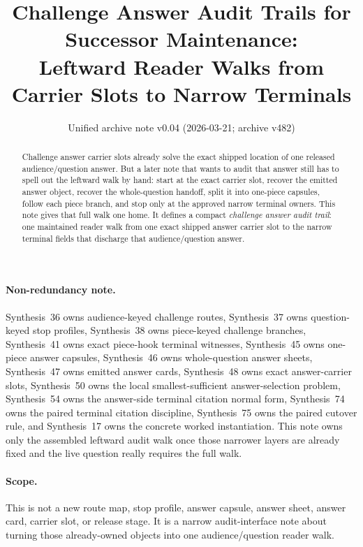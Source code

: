 \documentclass[11pt]{article}
\title{Challenge Answer Audit Trails for Successor Maintenance:\\[0.5ex]
\large Leftward Reader Walks from Carrier Slots to Narrow Terminals}
\author{}
\date{Unified archive note v0.04 (2026-03-21; archive v482)}
\begin{document}
\maketitle

\begin{abstract}
Challenge answer carrier slots already solve the exact shipped location of one released audience/question answer.
But a later note that wants to audit that answer still has to spell out the leftward walk by hand: start at the exact carrier slot, recover the emitted answer object, recover the whole-question handoff, split it into one-piece capsules, follow each piece branch, and stop only at the approved narrow terminal owners.
This note gives that full walk one home.
It defines a compact \emph{challenge answer audit trail}: one maintained reader walk from one exact shipped answer carrier slot to the narrow terminal fields that discharge that audience/question answer.
\end{abstract}

\paragraph{Non-redundancy note.}
Synthesis~36 owns audience-keyed challenge routes, Synthesis~37 owns question-keyed stop profiles, Synthesis~38 owns piece-keyed challenge branches, Synthesis~41 owns exact piece-hook terminal witnesses, Synthesis~45 owns one-piece answer capsules, Synthesis~46 owns whole-question answer sheets, Synthesis~47 owns emitted answer cards, Synthesis~48 owns exact answer-carrier slots, Synthesis~50 owns the local smallest-sufficient answer-selection problem, Synthesis~54 owns the answer-side terminal citation normal form, Synthesis~74 owns the paired terminal citation discipline, Synthesis~75 owns the paired cutover rule, and Synthesis~17 owns the concrete worked instantiation.
This note owns only the assembled leftward audit walk once those narrower layers are already fixed and the live question really requires the full walk.

\paragraph{Scope.}
This is not a new route map, stop profile, answer capsule, answer sheet, answer card, carrier slot, or release stage.
It is a narrow audit-interface note about turning those already-owned objects into one audience/question reader walk.
\end{document}

